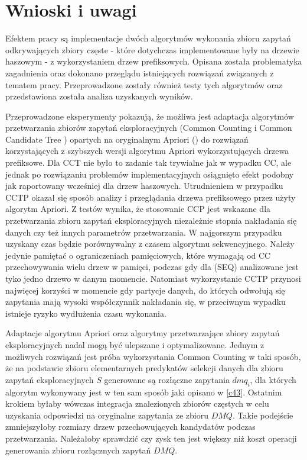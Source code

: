 \chapter{Wnioski i uwagi}

Efektem pracy są implementacje dwóch algorytmów wykonania zbioru zapytań odkrywających zbiory częste - które dotychczas implementowane były na drzewie haszowym - z wykorzystaniem drzew prefiksowych. Opisana została problematyka zagadnienia oraz dokonano przeglądu istniejących rozwiązań związanych z tematem pracy. Przeprowadzone zostały również testy tych algorytmów oraz przedstawiona została analiza uzyskanych wyników. 

Przeprowadzone eksperymenty pokazują, że możliwa jest adaptacja algorytmów przetwarzania zbiorów zapytań eksploracyjnych (Common Counting \cite{WojciechowskiCC} i Common Candidate Tree \cite{WojciechowskiCCT}) opartych na oryginalnym Apriori (\cite{Agrawal}) do rozwiązań korzystających z szybszych wersji algorytmu Apriori wykorzystujących drzewa prefiksowe. Dla CCT nie było to zadanie tak trywialne jak w wypadku CC, ale jednak po rozwiązaniu problemów implementacyjnych osiągnięto efekt podobny jak raportowany wcześniej dla drzew haszowych. Utrudnieniem w przypadku CCTP okazał się sposób analizy i przeglądania drzewa prefiksowego przez użyty algorytm Apriori. Z testów wynika, że stosowanie CCP jest wskazane dla przetwarzania zbioru zapytań eksploracyjnych niezależnie stopnia nakładania się danych czy też innych parametrów przetwarzania. W najgorszym przypadku uzyskany czas będzie porównywalny z czasem algorytmu sekwencyjnego. Należy jedynie pamiętać o ograniczeniach pamięciowych, które wymagają od CC przechowywania wielu drzew w pamięci, podczas gdy dla (SEQ) analizowane jest tyko jedno drzewo w danym momencie. Natomiast wykorzystanie CCTP przynosi najwięcej korzyści w momencie gdy partycje danych, do których odwołują się zapytania mają wysoki współczynnik nakładania się, w przeciwnym wypadku istnieje ryzyko wydłużenia czasu wykonania.

Adaptacje algorytmu Apriori oraz algorytmy przetwarzające zbiory zapytań eksploracyjnych nadal mogą być ulepszane i optymalizowane. Jednym z możliwych rozwiązań jest próba wykorzystania Common Counting w taki sposób, że na podstawie zbioru elementarnych predykatów selekcji danych dla zbioru zapytań eksploracyjnych \(S\) generowane są rozłączne zapytania \(dmq_i\), dla których algorytm wykonywany jest w ten sam sposób jaki opisano w \ref{c43}. Ostatnim krokiem byłaby wówczas integracja znalezionych zbiorów częstych w celu uzyskania odpowiedzi na oryginalne zapytania ze zbioru \(DMQ\). Takie podejście zmniejszyłoby rozmiary drzew przechowujących kandydatów podczas przetwarzania. Należałoby sprawdzić czy zysk ten jest większy niż koszt operacji generowania zbioru rozłącznych zapytań \(DMQ\). 


